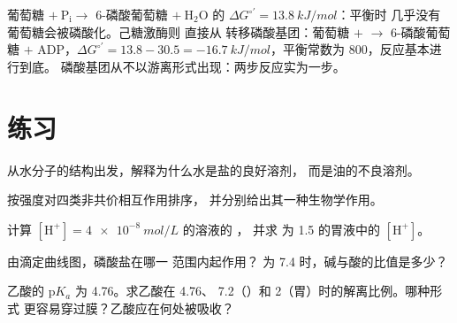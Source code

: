 \begin{example}[偶联]\label{ex:b1:water-small-molecules:coupling}
葡萄糖 $+\ \mathrm{P_i} \to$ 6-磷酸葡萄糖 $+\ \mathrm{H_2O}$
的 $\Delta G^{\circ\prime} = \qty{+13.8}{kJ/mol}$：平衡时
几乎没有葡萄糖会被磷酸化。己糖激酶则
直接从  转移磷酸基团：葡萄糖 $+$  $\to$
6-磷酸葡萄糖 $+$ ADP，$\Delta G^{\circ\prime} = 13.8 - 30.5 =
\qty{-16.7}{kJ/mol}$，平衡常数为 $800$，反应基本进行到底。
磷酸基团从不以游离形式出现：两步反应实为一步。
\end{example}

\section{练习}

\begin{exercise}[$\star$]\label{exo:b1:water-small-molecules:1}
从水分子的结构出发，解释为什么水是盐的良好溶剂，
而是油的不良溶剂。
\end{exercise}

\begin{exercise}[$\star$]\label{exo:b1:water-small-molecules:2}
按强度对四类非共价相互作用排序，
并分别给出其一种生物学作用。
\end{exercise}

\begin{exercise}[$\star$]\label{exo:b1:water-small-molecules:3}
计算 $[\mathrm{H^+}] = \qty{4e-8}{mol/L}$ 的溶液的 ，
并求  为 1.5 的胃液中的 $[\mathrm{H^+}]$。
\end{exercise}

\begin{exercise}[$\star$]\label{exo:b1:water-small-molecules:4}
由滴定曲线图，磷酸盐在哪一  范围内起作用？
 为 7.4 时，碱与酸的比值是多少？
\end{exercise}

\begin{exercise}[$\star\star$]\label{exo:b1:water-small-molecules:5}
乙酸的 p$K_a$ 为 4.76。求乙酸在  4.76、
 7.2（）和  2（胃）时的解离比例。哪种形式
更容易穿过膜？乙酸应在何处被吸收？
\end{exercise}

